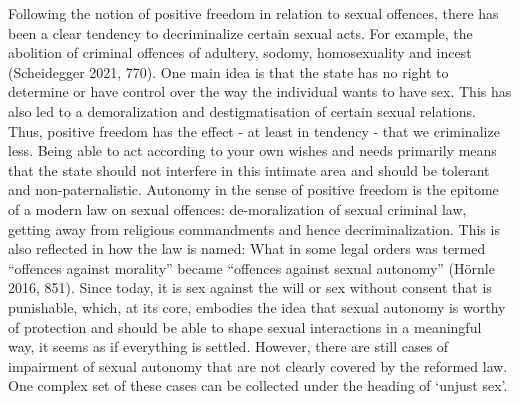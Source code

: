 Following the notion of positive freedom in relation to sexual offences,
there has been a clear tendency to decriminalize certain sexual acts.
For example, the abolition of criminal offences of adultery, sodomy,
homosexuality and incest (Scheidegger 2021, 770). One main idea is that
the state has no right to determine or have control over the way the
individual wants to have sex. This has also led to a demoralization and
destigmatisation of certain sexual relations. Thus, positive freedom has
the effect - at least in tendency - that we criminalize less. Being able
to act according to your own wishes and needs primarily means that the
state should not interfere in this intimate area and should be tolerant
and non-paternalistic. Autonomy in the sense of positive freedom is the
epitome of a modern law on sexual offences: de-moralization of sexual
criminal law, getting away from religious commandments and hence
decriminalization. This is also reflected in how the law is named: What
in some legal orders was termed ``offences against morality'' became
``offences against sexual autonomy'' (Hörnle 2016, 851). Since today, it
is sex against the will or sex without consent that is punishable,
which, at its core, embodies the idea that sexual autonomy is worthy of
protection and should be able to shape sexual interactions in a
meaningful way, it seems as if everything is settled. However, there are
still cases of impairment of sexual autonomy that are not clearly
covered by the reformed law. One complex set of these cases can be
collected under the heading of `unjust sex'.

